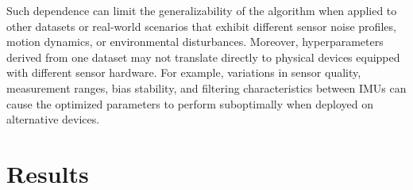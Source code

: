 \documentclass{iutbscthesis}
\begin{document}
Such dependence can limit the generalizability of the algorithm when applied to other datasets or real-world scenarios that exhibit different sensor noise profiles, motion dynamics, or environmental disturbances. Moreover, hyperparameters derived from one dataset may not translate directly to physical devices equipped with different sensor hardware. For example, variations in sensor quality, measurement ranges, bias stability, and filtering characteristics between IMUs can cause the optimized parameters to perform suboptimally when deployed on alternative devices.  

 











\chapter{Results} \label{chapter:results}
\end{document}
